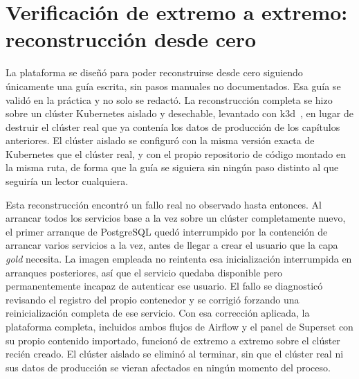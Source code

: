 \section{Verificación de extremo a extremo: reconstrucción desde cero}
\label{sec:visualizacion_verificacion}

La plataforma se diseñó para poder reconstruirse desde cero siguiendo
únicamente una guía escrita, sin pasos manuales no documentados. Esa guía
se validó en la práctica y no solo se redactó. La reconstrucción completa
se hizo sobre un clúster Kubernetes aislado y desechable, levantado con
k3d~\cite{k3d_docs}, en lugar de destruir el clúster real que ya contenía
los datos de producción de los capítulos anteriores. El clúster aislado
se configuró con la misma versión exacta de Kubernetes que el clúster
real, y con el propio repositorio de código montado en la misma ruta, de
forma que la guía se siguiera sin ningún paso distinto al que seguiría un
lector cualquiera.

Esta reconstrucción encontró un fallo real no observado hasta entonces.
Al arrancar todos los servicios base a la vez sobre un clúster
completamente nuevo, el primer arranque de PostgreSQL quedó interrumpido
por la contención de arrancar varios servicios a la vez, antes de llegar a
crear el usuario que la capa \textit{gold} necesita. La imagen empleada no
reintenta esa inicialización interrumpida en arranques posteriores, así
que el servicio quedaba disponible pero permanentemente incapaz de
autenticar ese usuario. El fallo se diagnosticó revisando el registro del
propio contenedor y se corrigió forzando una reinicialización completa de
ese servicio. Con esa corrección aplicada, la plataforma completa,
incluidos ambos flujos de Airflow y el panel de Superset con su propio
contenido importado, funcionó de extremo a extremo sobre el clúster
recién creado. El clúster aislado se eliminó al terminar, sin que el
clúster real ni sus datos de producción se vieran afectados en ningún
momento del proceso.
